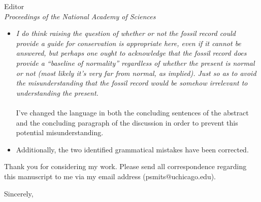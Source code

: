 \documentclass{letter}
\begin{document}
\begin{letter}{Editor \\ \textit{Proceedings of the National Academy of Sciences}}
\begin{itemize}
      \\\\In the discussion of the results of the effects of locomotor category I've added discussion of the Vallesian crisis. While the Vallesian crisis is primarily a European phenomenon and thus might not be driving these results, it may provide some insight into faunal turnover in North America.
    \item \textit{I do think raising the question of whether or not the fossil record could provide a guide for conservation is appropriate here, even if it cannot be answered, but perhaps one ought to acknowledge that the fossil record does provide a ``baseline of normality'' regardless of whether the present is normal or not (most likely it's very far from normal, as implied). Just so as to avoid the misunderstanding that the fossil record would be somehow irrelevant to understanding the present.}
      \\\\I've changed the language in both the concluding sentences of the abstract and the concluding paragraph of the discussion in order to prevent this potential misunderstanding.
    \item Additionally, the two identified grammatical mistakes have been corrected.
  \end{itemize}


  Thank you for considering my work. Please send all correspondence regarding this manuscript to me via my email address (psmits@uchicago.edu).

  \closing{Sincerely,}


\end{letter}


\end{document}
